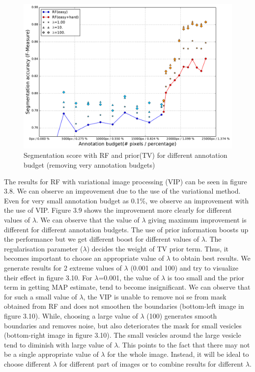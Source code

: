 \begin{figure}[h!] \label{fig:rf_vip}
\centering
 \includegraphics[width=0.75\linewidth]{figures/rf_vip_easy_then_hard.pdf}
\caption{Segmentation score with RF and prior(TV) for different annotation budget (removing very annotation budgets)}
\end{figure}

The results for RF with variational image processing (VIP) can be seen in figure 3.8. We can observe an improvement due to the use of the variational method. Even for very small annotation budget as 0.1\%, we observe an improvement with the use of VIP. Figure 3.9 shows the improvement more clearly for different values of $\lambda$. We can observe that the value of $\lambda$ giving maximum improvement is different for different annotation budgets. The use of prior information boosts up the performance but we get different boost for different values of $\lambda$. The regularisation parameter ($\lambda$) decides the weight of TV prior term. Thus, it becomes important to choose an appropriate value of $\lambda$ to obtain best results. We generate results for 2 extreme values of $\lambda$ (0.001 and 100) and try to visualize their effect in figure 3.10. 
For $\lambda$=0.001, the value of $\lambda$ is too small and the prior term in getting MAP estimate, tend to become insignificant. We can observe that for such a small value of $\lambda$, the VIP is unable to remove noi se from mask obtained from RF and does not smoothen the boundaries (bottom-left image in figure 3.10). While, choosing a large value of $\lambda$ (100) generates smooth boundaries and removes noise, but also deteriorates the mask for small vesicles (bottom-right image in figure 3.10). The small vesicles around the large vesicle tend to diminish with large value of $\lambda$. This points to the fact that there may not be a single appropriate value of $\lambda$ for the whole image. Instead, it will be ideal to choose different $\lambda$ for different part of images or to combine results for different $\lambda$. 

